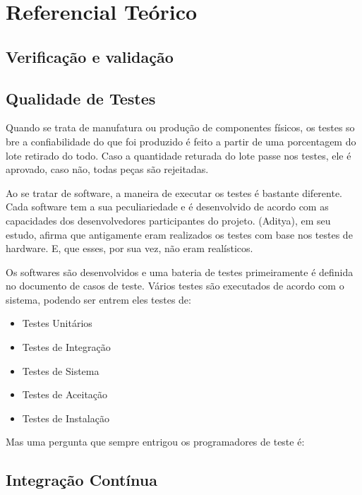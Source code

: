 \chapter[Referencial]{Referencial Teórico}

\section{Verificação e validação}
\section{Qualidade de Testes}
Quando se trata de manufatura ou produção de componentes físicos, os testes so
bre a confiabilidade do que foi produzido é feito a partir de uma porcentagem
do lote retirado do todo. Caso a quantidade returada do lote passe nos testes,
ele é aprovado, caso não, todas peças são rejeitadas.

Ao se tratar de software, a maneira de executar os testes é bastante diferente.
Cada software tem a sua peculiariedade e é desenvolvido de acordo com as
capacidades dos desenvolvedores participantes do projeto. (Aditya), em seu estudo,
afirma que antigamente eram realizados os testes com base nos testes de hardware.
E, que esses, por sua vez, não eram realísticos.

Os softwares são desenvolvidos e uma bateria de testes primeiramente é definida no
documento de casos de teste. Vários testes são  executados de acordo com o sistema,
podendo ser entrem eles testes de:

\begin{itemize}
\item Testes Unitários
\item Testes de Integração
\item Testes de Sistema
\item Testes de Aceitação
\item Testes de Instalação
\end{itemize}

Mas uma pergunta que sempre entrigou os programadores de teste é:
\section{Integração Contínua}

